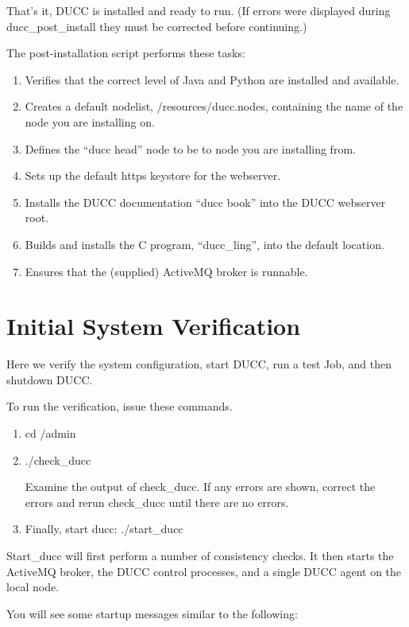 That's it, DUCC is installed and ready to run. (If errors were displayed during ducc\_post\_install
they must be corrected before continuing.)

The post-installation script performs these tasks:
\begin{enumerate}
    \item Verifies that the correct level of Java and Python are installed and available.
    \item Creates a default nodelist, \duccruntime/resources/ducc.nodes, containing the name of the node you are installing on.
    \item Defines the ``ducc head'' node to be to node you are installing from.
    \item Sets up the default https keystore for the webserver.
    \item Installs the DUCC documentation ``ducc book'' into the DUCC webserver root.
    \item Builds and installs the C program, ``ducc\_ling'', into the default location.
    \item Ensures that the (supplied) ActiveMQ broker is runnable.
\end{enumerate}

\section{Initial System Verification}

Here we verify the system configuration, start DUCC, run a test Job, and then shutdown DUCC.

To run the verification, issue these commands.
\begin{enumerate}
  \item cd \duccruntime/admin 
  \item ./check\_ducc
  
    Examine the output of check\_ducc.  If any errors are shown, correct the errors and rerun
    check\_ducc until there are no errors.  
  \item Finally, start ducc: ./start\_ducc
  \end{enumerate}
  
  Start\_ducc will first perform a number of consistency checks.
  It then starts the ActiveMQ broker, the DUCC control processes, and a single DUCC agent on the
  local node.

  You will see some startup messages similar to the following:

